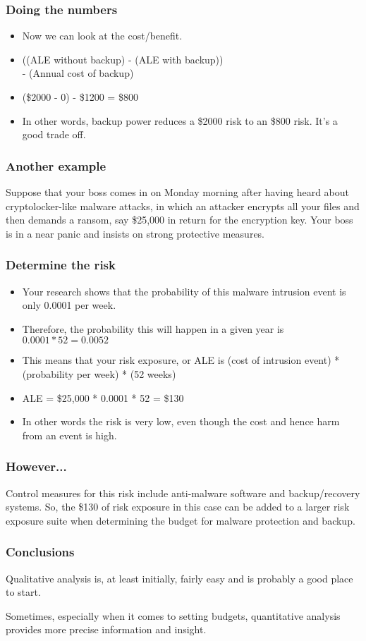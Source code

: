 \documentclass[10pt]{beamer}
\begin{document}
\begin{frame}
	\frametitle{Doing the numbers}

	\begin{itemize}
		\item Now we can look at the cost/benefit.
		\item ((ALE without backup) - (ALE with backup))  \\ - (Annual cost of backup)
		\item  (\$2000 - 0) - \$1200 = \$800
        \item In other words, backup power reduces a \$2000 risk to 
			an \$800 risk. It's a good trade off.
	\end{itemize}
\end{frame}
\begin{frame}
	\frametitle{Another example}

	Suppose that your boss comes in on Monday morning after having heard 
	about cryptolocker-like malware attacks, in which an attacker encrypts
	all your files and then demands a ransom, say \$25,000 in return for the
	encryption key.  Your boss is in a near panic and insists on strong
	protective measures.
\end{frame}
\begin{frame}
	\frametitle{Determine the risk}

	\begin{itemize}
		\item Your research shows that the probability of 
			this malware intrusion event is only 
			0.0001 per week.
		\item Therefore, the probability this will happen in a given year is $0.0001 * 52 = 0.0052$
		\item This means that your risk exposure, or ALE is
			(cost of intrusion event) * (probability per week) * (52 weeks)
		\item ALE = \$25,000 * 0.0001 * 52 = \$130
		\item In other words the risk is very low, even though the cost and hence harm from an event is high.
	\end{itemize}
\end{frame}

\begin{frame}
	\frametitle{However...}

	Control measures for this risk include anti-malware software and
	backup/recovery systems.  So, the \$130 of risk exposure in this case
	can be added to a larger risk exposure suite when determining the budget 
	for malware protection and backup.
\end{frame}

\begin{frame}
	\frametitle{Conclusions}
	
	Qualitative analysis is, at least initially, fairly easy and is probably a good place to start.
	
	\vspace{10mm}
	Sometimes, especially when it comes to setting budgets, quantitative analysis provides more precise information and insight.
\end{frame}
\end{document}
